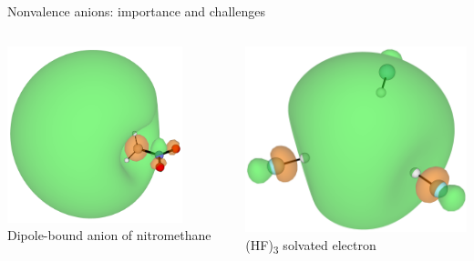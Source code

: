\documentclass[9pt,t,xcolor=table]{beamer}
\begin{document}
\begin{frame}{\huge Nonvalence anions: importance and challenges}
\begin{columns}
\begin{column}{0.3\textwidth}
			\centering
			\includegraphics[width=0.8\textwidth]{Figs/MeNO2_DBS.png}\\
			\vspace{3pt}
    		\small Dipole-bound anion of nitromethane
		\end{column}
		\begin{column}{0.27\textwidth}
			\centering
			\includegraphics[width=\textwidth]{Figs/hf3.png}\\
			(HF)\textsubscript{3} solvated electron
		\end{column}	
	\end{columns}
\end{frame}
\end{document}
